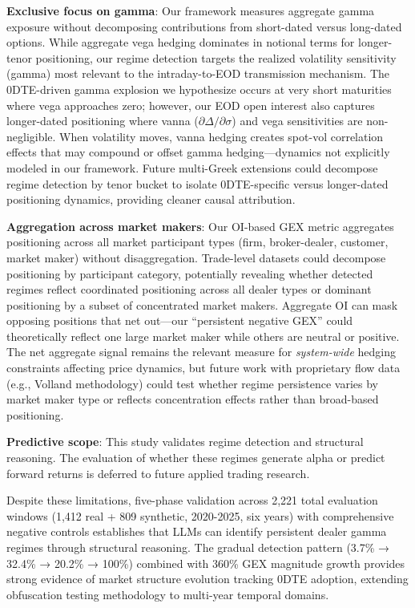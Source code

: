 \textbf{Exclusive focus on gamma}: Our framework measures aggregate gamma exposure without decomposing contributions from short-dated versus long-dated options. While aggregate vega hedging dominates in notional terms for longer-tenor positioning, our regime detection targets the realized volatility sensitivity (gamma) most relevant to the intraday-to-EOD transmission mechanism. The 0DTE-driven gamma explosion we hypothesize occurs at very short maturities where vega approaches zero; however, our EOD open interest also captures longer-dated positioning where vanna ($\partial\Delta/\partial\sigma$) and vega sensitivities are non-negligible. When volatility moves, vanna hedging creates spot-vol correlation effects that may compound or offset gamma hedging---dynamics not explicitly modeled in our framework. Future multi-Greek extensions could decompose regime detection by tenor bucket to isolate 0DTE-specific versus longer-dated positioning dynamics, providing cleaner causal attribution.

\textbf{Aggregation across market makers}: Our OI-based GEX metric aggregates positioning across all market participant types (firm, broker-dealer, customer, market maker) without disaggregation. Trade-level datasets could decompose positioning by participant category, potentially revealing whether detected regimes reflect coordinated positioning across all dealer types or dominant positioning by a subset of concentrated market makers. Aggregate OI can mask opposing positions that net out---our ``persistent negative GEX'' could theoretically reflect one large market maker while others are neutral or positive. The net aggregate signal remains the relevant measure for \textit{system-wide} hedging constraints affecting price dynamics, but future work with proprietary flow data (e.g., Volland methodology) could test whether regime persistence varies by market maker type or reflects concentration effects rather than broad-based positioning.

\textbf{Predictive scope}: This study validates regime detection and structural reasoning. The evaluation of whether these regimes generate alpha or predict forward returns is deferred to future applied trading research.

Despite these limitations, five-phase validation across 2,221 total evaluation windows (1,412 real + 809 synthetic, 2020-2025, six years) with comprehensive negative controls establishes that LLMs can identify persistent dealer gamma regimes through structural reasoning. The gradual detection pattern (3.7\% → 32.4\% → 20.2\% → 100\%) combined with 360\% GEX magnitude growth provides strong evidence of market structure evolution tracking 0DTE adoption, extending obfuscation testing methodology to multi-year temporal domains.

